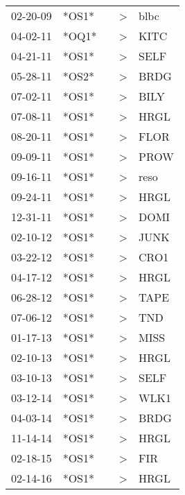 \begin{supertabular}{lllll}
 02-20-09 &  *OS1* &   &  \textgreater &  blbc \\
 04-02-11 &  *OQ1* &   &  \textgreater &  KITC \\
 04-21-11 &  *OS1* &   &  \textgreater &  SELF \\
 05-28-11 &  *OS2* &   &  \textgreater &  BRDG \\
 07-02-11 &  *OS1* &   &  \textgreater &  BILY \\
 07-08-11 &  *OS1* &   &  \textgreater &  HRGL \\
 08-20-11 &  *OS1* &   &  \textgreater &  FLOR \\
 09-09-11 &  *OS1* &   &  \textgreater &  PROW \\
 09-16-11 &  *OS1* &   &  \textgreater &  reso \\
 09-24-11 &  *OS1* &   &  \textgreater &  HRGL \\
 12-31-11 &  *OS1* &   &  \textgreater &  DOMI \\
 02-10-12 &  *OS1* &   &  \textgreater &  JUNK \\
 03-22-12 &  *OS1* &   &  \textgreater &  CRO1 \\
 04-17-12 &  *OS1* &   &  \textgreater &  HRGL \\
 06-28-12 &  *OS1* &   &  \textgreater &  TAPE \\
 07-06-12 &  *OS1* &   &  \textgreater &   TND \\
 01-17-13 &  *OS1* &   &  \textgreater &  MISS \\
 02-10-13 &  *OS1* &   &  \textgreater &  HRGL \\
 03-10-13 &  *OS1* &   &  \textgreater &  SELF \\
 03-12-14 &  *OS1* &   &  \textgreater &  WLK1 \\
 04-03-14 &  *OS1* &   &  \textgreater &  BRDG \\
 11-14-14 &  *OS1* &   &  \textgreater &  HRGL \\
 02-18-15 &  *OS1* &   &  \textgreater &   FIR \\
 02-14-16 &  *OS1* &   &  \textgreater &  HRGL \\
\end{supertabular}
